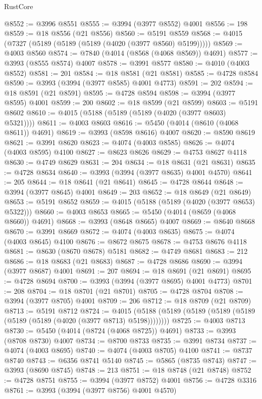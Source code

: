 \begin{lexlean}{RustCore}
\begin{coremodule}
@8552 := @3996 @8551
@8555 := @3994 (@3977 @8552) @4001
@8556 := 198
@8559 := @18 @8556 (@21 @8556)
@8560 := @5191 @8559
@8568 := @4015 (@7327 (@5189 (@5189 (@5189 (@4020 (@3977 @8560) @5199)))))
@8569 := @4003 @8560
@8574 := @7840 (@4014 (@8568 (@4068 @8569)) @4691)
@8577 := @3993 (@8555 @8574) @4007
@8578 := @3991 @8577
@8580 := @4010 (@4003 @8552)
@8581 := 201
@8584 := @18 @8581 (@21 @8581)
@8585 := @4728 @8584
@8590 := @3993 (@3994 (@3977 @8585) @4001 @4773)
@8591 := 202
@8594 := @18 @8591 (@21 @8591)
@8595 := @4728 @8594
@8598 := @3994 (@3977 @8595) @4001
@8599 := 200
@8602 := @18 @8599 (@21 @8599)
@8603 := @5191 @8602
@8610 := @4015 (@5188 (@5189 (@5189 (@4020 (@3977 @8603) @5321))))
@8611 := @4003 @8603
@8616 := @5450 (@4014 (@8610 (@4068 @8611)) @4691)
@8619 := @3993 (@8598 @8616) @4007
@8620 := @8590 @8619
@8621 := @3991 @8620
@8623 := @4074 (@4003 @8585)
@8626 := @4074 (@4003 @8595) @4100
@8627 := @8623 @8626
@8629 := @4753 @8627 @4118
@8630 := @4749 @8629
@8631 := 204
@8634 := @18 @8631 (@21 @8631)
@8635 := @4728 @8634
@8640 := @3993 (@3994 (@3977 @8635) @4001 @4570)
@8641 := 205
@8644 := @18 @8641 (@21 @8641)
@8645 := @4728 @8644
@8648 := @3994 (@3977 @8645) @4001
@8649 := 203
@8652 := @18 @8649 (@21 @8649)
@8653 := @5191 @8652
@8659 := @4015 (@5188 (@5189 (@4020 (@3977 @8653) @5322)))
@8660 := @4003 @8653
@8665 := @5450 (@4014 (@8659 (@4068 @8660)) @4691)
@8668 := @3993 (@8648 @8665) @4007
@8669 := @8640 @8668
@8670 := @3991 @8669
@8672 := @4074 (@4003 @8635)
@8675 := @4074 (@4003 @8645) @4100
@8676 := @8672 @8675
@8678 := @4753 @8676 @4118
@8681 := @8630 (@8670 @8678) @5181
@8682 := @4749 @8681
@8683 := 212
@8686 := @18 @8683 (@21 @8683)
@8687 := @4728 @8686
@8690 := @3994 (@3977 @8687) @4001
@8691 := 207
@8694 := @18 @8691 (@21 @8691)
@8695 := @4728 @8694
@8700 := @3993 (@3994 (@3977 @8695) @4001 @4773)
@8701 := 208
@8704 := @18 @8701 (@21 @8701)
@8705 := @4728 @8704
@8708 := @3994 (@3977 @8705) @4001
@8709 := 206
@8712 := @18 @8709 (@21 @8709)
@8713 := @5191 @8712
@8724 := @4015 (@5188 (@5189 (@5189 (@5189 (@5189 (@5189 (@5189 (@4020 (@3977 @8713) @5198))))))))
@8725 := @4003 @8713
@8730 := @5450 (@4014 (@8724 (@4068 @8725)) @4691)
@8733 := @3993 (@8708 @8730) @4007
@8734 := @8700 @8733
@8735 := @3991 @8734
@8737 := @4074 (@4003 @8695)
@8740 := @4074 (@4003 @8705) @4100
@8741 := @8737 @8740
@8743 := @6356 @8741 @5140
@8745 := @5865 (@8735 @8743)
@8747 := @3993 (@8690 @8745)
@8748 := 213
@8751 := @18 @8748 (@21 @8748)
@8752 := @4728 @8751
@8755 := @3994 (@3977 @8752) @4001
@8756 := @4728 @3316
@8761 := @3993 (@3994 (@3977 @8756) @4001 @4570)

\end{coremodule}
\end{lexlean}
